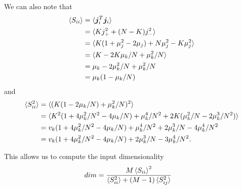\documentclass{article}
\renewcommand\b\bm
\begin{document}
We can also note that
\begin{align}
    \braket{S_{ii}} &= \braket{\b{j}_i^T \b{j}_i}\\
    &= \braket{K j_+^2 + (N-K) j_-^2}\\
    &= \braket{K (1 + \mu_j^2 - 2 \mu_j)  + N \mu_j^2 - K \mu_j^2}\\
    &= \braket{K - 2 K \mu_k/N + \mu_k^2/N}\\
    &= \mu_k - 2 \mu_k^2/N + \mu_k^2 / N\\
    &= \mu_k (1 - \mu_k / N)
\end{align}
and
\begin{align}
    \braket{S_{ii}^2} &= \braket{(K(1 - 2 \mu_k/N) + \mu_k^2/N)^2}\\
    &= \braket{K^2(1 + 4 \mu_k^2 / N^2 - 4 \mu_k/N) + \mu_k^4/N^2 + 2 K (\mu_k^2/N - 2 \mu_k^3/N^2)}\\
    &= v_k(1 + 4 \mu_k^2 / N^2 - 4 \mu_k/N) + \mu_k^4/N^2 + 2 \mu_k^3/N - 4 \mu_k^4/N^2\\
    &= v_k(1 + 4 \mu_k^2 / N^2 - 4 \mu_k/N) + 2 \mu_k^3/N - 3 \mu_k^4/N^2.
\end{align}

This allows us to compute the input dimensionality
\begin{align}
    dim &= \frac{M \braket{S_{ii}}^2}{\braket{S_{ii}^2} + (M-1) \braket{S_{ij}^2}}
\end{align}
\end{document}
